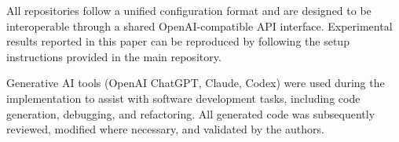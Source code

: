 All repositories follow a unified configuration format and are designed to be interoperable through a shared OpenAI-compatible API interface.
Experimental results reported in this paper can be reproduced by following the setup instructions provided in the main repository.

Generative AI tools (OpenAI ChatGPT, Claude, Codex) were used during the implementation to assist with software development tasks, including code generation, debugging, and refactoring.
All generated code was subsequently reviewed, modified where necessary, and validated by the authors.
